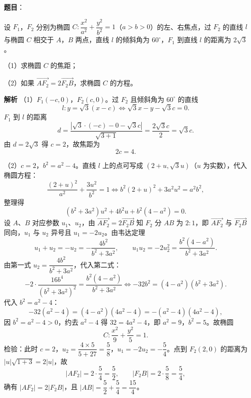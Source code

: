 \begin{answer}

\textbf{题目}：

设 $F_1$，$F_2$ 分别为椭圆 $C:\dfrac{x^2}{a^2}+\dfrac{y^2}{b^2}=1$（$a>b>0$）的左、右焦点，过 $F_2$ 的直线 $l$ 与椭圆 $C$ 相交于 $A$，$B$ 两点，直线 $l$ 的倾斜角为 $60^\circ$，$F_1$ 到直线 $l$ 的距离为 $2\sqrt3$。

（1）求椭圆 $C$ 的焦距；

（2）如果 $\overrightarrow{AF_2}=2\overrightarrow{F_2B}$，求椭圆 $C$ 的方程。

\textbf{解析}
（1）$F_1(-c,0)$，$F_2(c,0)$。过 $F_2$ 且倾斜角为 $60^\circ$ 的直线
\nopagebreak[4]
\[l:y=\sqrt3(x-c)\iff\sqrt3x-y-\sqrt3c=0.\]
$F_1$ 到 $l$ 的距离
\nopagebreak[4]
\[d=\frac{|\sqrt3\cdot(-c)-0-\sqrt3c|}{\sqrt{3+1}}=\frac{2\sqrt3c}{2}=\sqrt3c.\]
由 $d=2\sqrt3$ 得 $c=2$，故焦距为
\nopagebreak[4]
\[2c=4.\]

（2）$c=2$，$b^2=a^2-4$。直线 $l$ 上的点可写成 $(2+u,\sqrt3u)$（$u$ 为实数），代入椭圆方程：
\nopagebreak[4]
\[\frac{(2+u)^2}{a^2}+\frac{3u^2}{b^2}=1
\iff b^2(2+u)^2+3a^2u^2=a^2b^2,\]
整理得
\nopagebreak[4]
\[(b^2+3a^2)u^2+4b^2u+b^2(4-a^2)=0.\]
设 $A$、$B$ 对应参数 $u_1$、$u_2$，由 $\overrightarrow{AF_2}=2\overrightarrow{F_2B}$ 知 $F_2$ 分 $AB$ 为 $2:1$，即 $\overrightarrow{AF_2}$ 与 $\overrightarrow{F_2B}$ 同向，$u_1$ 与 $u_2$ 异号且 $u_1=-2u_2$。由韦达定理
\nopagebreak[4]
\[u_1+u_2=-u_2=-\frac{4b^2}{b^2+3a^2},\qquad
u_1u_2=-2u_2^2=\frac{b^2(4-a^2)}{b^2+3a^2}.\]
由第一式 $u_2=\dfrac{4b^2}{b^2+3a^2}$，代入第二式：
\nopagebreak[4]
\[-2\cdot\frac{16b^4}{(b^2+3a^2)^2}=\frac{b^2(4-a^2)}{b^2+3a^2}
\iff-32b^2=(4-a^2)(b^2+3a^2).\]
代入 $b^2=a^2-4$：
\nopagebreak[4]
\[-32(a^2-4)=(4-a^2)(4a^2-4)=-(a^2-4)(4a^2-4),\]
因 $b^2=a^2-4>0$，约去 $a^2-4$ 得 $32=4a^2-4$，即 $a^2=9$，$b^2=5$。故椭圆
\nopagebreak[4]
\[C:\frac{x^2}{9}+\frac{y^2}{5}=1.\]
检验：此时 $c=2$，$u_2=\dfrac{4\times5}{5+27}=\dfrac58$，$u_1=-2u_2=-\dfrac54$。点到 $F_2(2,0)$ 的距离为 $|u|\sqrt{1+3}=2|u|$，故
\nopagebreak[4]
\[|AF_2|=2\cdot\frac54=\frac52,\qquad |F_2B|=2\cdot\frac58=\frac54,\]
确有 $|AF_2|=2|F_2B|$，且 $|AB|=\dfrac52+\dfrac54=\dfrac{15}{4}$。


\end{answer}
